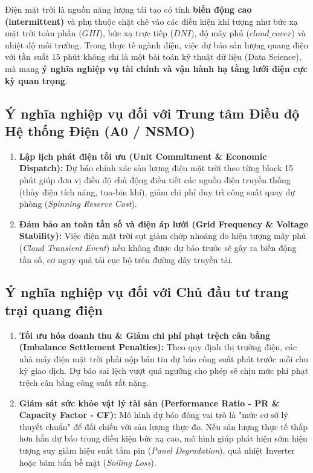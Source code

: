 \documentclass[12pt,a4paper]{article}
\begin{document}
Điện mặt trời là nguồn năng lượng tái tạo có tính \textbf{biến động cao (intermittent)} và phụ thuộc chặt chẽ vào các điều kiện khí tượng như bức xạ mặt trời toàn phần ($GHI$), bức xạ trực tiếp ($DNI$), độ mây phủ ($cloud\_cover$) và nhiệt độ môi trường. Trong thực tế ngành điện, việc dự báo sản lượng quang điện với tần suất 15 phút không chỉ là một bài toán kỹ thuật dữ liệu (Data Science), mà mang \textbf{ý nghĩa nghiệp vụ tài chính và vận hành hạ tầng lưới điện cực kỳ quan trọng}.

\subsection{Ý nghĩa nghiệp vụ đối với Trung tâm Điều độ Hệ thống Điện (A0 / NSMO)}
\begin{enumerate}
    \item \textbf{Lập lịch phát điện tối ưu (Unit Commitment \& Economic Dispatch):} Dự báo chính xác sản lượng điện mặt trời theo từng block 15 phút giúp đơn vị điều độ chủ động điều tiết các nguồn điện truyền thống (thủy điện tích năng, tua-bin khí), giảm chi phí duy trì công suất quay dự phòng (\textit{Spinning Reserve Cost}).
    \item \textbf{Đảm bảo an toàn tần số và điện áp lưới (Grid Frequency \& Voltage Stability):} Việc điện mặt trời sụt giảm chớp nhoáng do hiện tượng mây phủ (\textit{Cloud Transient Event}) nếu không được dự báo trước sẽ gây ra biến động tần số, cơ nguy quá tải cục bộ trên đường dây truyền tải.
\end{enumerate}

\subsection{Ý nghĩa nghiệp vụ đối với Chủ đầu tư trang trại quang điện}
\begin{enumerate}
    \item \textbf{Tối ưu hóa doanh thu \& Giảm chi phí phạt trệch cân bằng (Imbalance Settlement Penalties):} Theo quy định thị trường điện, các nhà máy điện mặt trời phải nộp bản tin dự báo công suất phát trước mỗi chu kỳ giao dịch. Dự báo sai lệch vượt quá ngưỡng cho phép sẽ chịu mức phí phạt trệch cân bằng công suất rất nặng.
    \item \textbf{Giám sát sức khỏe vật lý tài sản (Performance Ratio - PR \& Capacity Factor - CF):} Mô hình dự báo đóng vai trò là "mức cơ sở lý thuyết chuẩn" để đối chiếu với sản lượng thực đo. Nếu sản lượng thực tế thấp hơn hẳn dự báo trong điều kiện bức xạ cao, mô hình giúp phát hiện sớm hiện tượng suy giảm hiệu suất tấm pin (\textit{Panel Degradation}), quá nhiệt Inverter hoặc bám bẩn bề mặt (\textit{Soiling Loss}).
\end{enumerate}
\end{document}
